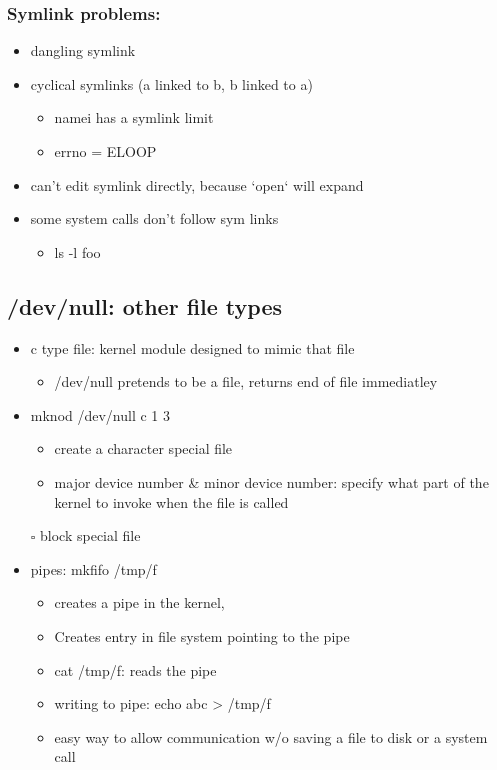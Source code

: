 \documentclass[11pt]{article}
\begin{document}
\subsubsection{Symlink problems:}
\label{sec:org28d689e}
\begin{itemize}
\item dangling symlink
\item cyclical symlinks (a linked to b, b linked to a)
\begin{itemize}
\item namei has a symlink limit
\item errno = ELOOP
\end{itemize}
\item can't edit symlink directly, because `open` will expand
\item some system calls don't follow sym links
\begin{itemize}
\item ls -l foo
\end{itemize}
\end{itemize}
\subsection{/dev/null: other file types}
\label{sec:org83970f0}
\begin{itemize}
\item c type file: kernel module designed to mimic that file
\begin{itemize}
\item /dev/null pretends to be a file, returns end of file immediatley
\end{itemize}
\item mknod /dev/null c 1 3
\begin{itemize}
\item create a character special file
\item major device number \& minor device number: specify what part of the kernel to invoke when the file is called
\end{itemize}
\item[{$\square$}] block special file
\item pipes: mkfifo /tmp/f
\begin{itemize}
\item creates a pipe in the kernel,
\item Creates entry in file system pointing to the pipe
\item cat /tmp/f: reads the pipe
\item writing to pipe: echo abc > /tmp/f
\item easy way to allow communication w/o saving a file to disk or a system call
\end{itemize}
\end{itemize}
\end{document}
